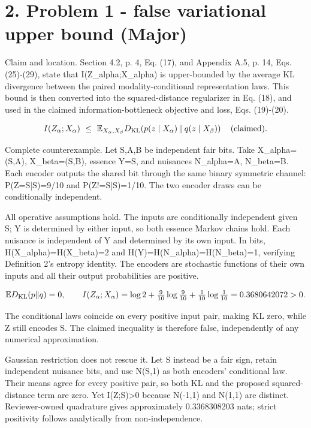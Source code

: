 \documentclass[10pt]{article}
\begin{document}
\section*{2. Problem 1 - false variational upper bound (Major)}
Claim and location. Section 4.2, p. 4, Eq. (17), and Appendix A.5, p. 14, Eqs. (25)-(29), state that I(Z\_alpha;X\_alpha) is upper-bounded by the average KL divergence between the paired modality-conditional representation laws. This bound is then converted into the squared-distance regularizer in Eq. (18), and used in the claimed information-bottleneck objective and loss, Eqs. (19)-(20).\par
\[I(Z_\alpha;X_\alpha)\ \leq\ {\mathbb E}_{X_\alpha,X_\beta}D_{\rm KL}\!\left(p(z\mid X_\alpha)\,\|\,q(z\mid X_\beta)\right)\quad\hbox{(claimed).}\]\par
Complete counterexample. Let S,A,B be independent fair bits. Take X\_alpha=(S,A), X\_beta=(S,B), essence Y=S, and nuisances N\_alpha=A, N\_beta=B. Each encoder outputs the shared bit through the same binary symmetric channel: P(Z=S|S)=9/10 and P(Z!=S|S)=1/10. The two encoder draws can be conditionally independent.\par
All operative assumptions hold. The inputs are conditionally independent given S; Y is determined by either input, so both essence Markov chains hold. Each nuisance is independent of Y and determined by its own input. In bits, H(X\_alpha)=H(X\_beta)=2 and H(Y)=H(N\_alpha)=H(N\_beta)=1, verifying Definition 2’s entropy identity. The encoders are stochastic functions of their own inputs and all their output probabilities are positive.\par
\[\mathbb E D_{\rm KL}(p\|q)=0,\qquad I(Z_\alpha;X_\alpha)=\log 2+\tfrac9{10}\log\tfrac9{10}+\tfrac1{10}\log\tfrac1{10}=0.3680642072>0.\]\par
The conditional laws coincide on every positive input pair, making KL zero, while Z still encodes S. The claimed inequality is therefore false, independently of any numerical approximation.\par
Gaussian restriction does not rescue it. Let S instead be a fair sign, retain independent nuisance bits, and use N(S,1) as both encoders’ conditional law. Their means agree for every positive pair, so both KL and the proposed squared-distance term are zero. Yet I(Z;S)>0 because N(-1,1) and N(1,1) are distinct. Reviewer-owned quadrature gives approximately 0.3368308203 nats; strict positivity follows analytically from non-independence.\par
\end{document}
